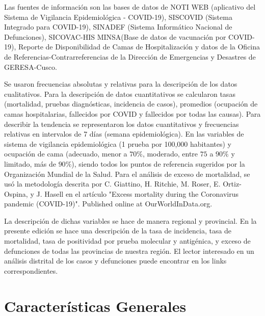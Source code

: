 \documentclass[12pt,a4paper,openany]{book}
\begin{document}
	Las fuentes de información son las bases de datos de NOTI WEB (aplicativo del Sistema de Vigilancia Epidemiológica - COVID-19), SISCOVID (Sistema Integrado para COVID-19), SINADEF (Sistema Informático Nacional de Defunciones), SICOVAC-HIS MINSA(Base de datos de vacunación por COVID-19), Reporte de Disponibilidad de Camas de Hospitalización y datos de la Oficina de Referencias-Contrarreferencias de la Dirección de Emergencias y Desastres de GERESA-Cusco. 
	
	Se usaron frecuencias absolutas y relativas para la descripción de los datos cualitativos. Para la descripción de datos cuantitativos se calcularon tasas (mortalidad, pruebas diagnósticas, incidencia de casos), promedios (ocupación de camas hospitalarias, fallecidos por COVID y fallecidos por todas las causas). Para describir la tendencia se representaron los datos cuantitativos y frecuencias relativas en intervalos de 7 días (semana epidemiológica). En las variables de sistema de vigilancia epidemiológica (1 prueba por 100,000 habitantes) y ocupación de cama (adecuado, menor a $70\%$, moderado, entre $75$ a $90\%$ y limitado, más de $90\%$), siendo todos los puntos de referencia sugeridos por la Organización Mundial de la Salud. Para el análisis de exceso de mortalidad, se usó la metodología descrita por C. Giattino, H. Ritchie, M. Roser, E. Ortiz-Ospina, y J. Hasell en el artículo "Excess mortality during the Coronavirus pandemic (COVID-19)". Published online at OurWorldInData.org.
	
	La descripción de dichas variables se hace de manera regional y provincial. En la presente edición se hace una descripción de la tasa de incidencia, tasa de mortalidad, tasa de positividad por prueba molecular y antigénica, y exceso de defunciones de todas las provincias de nuestra región. El lector interesado en un análisis distrital de los casos y defunciones puede encontrar en los links correspondientes.
	 
	
	\clearpage	
	\section*{Características Generales}
	
	
	
\end{document}

